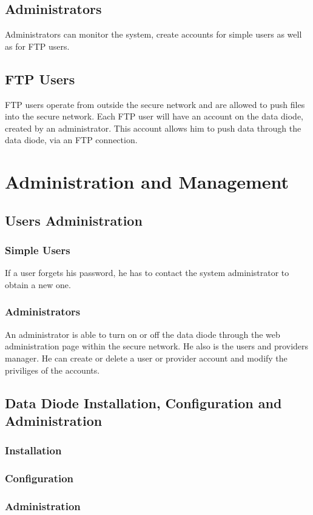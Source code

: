 \documentclass[a4paper,11pt]{article}
\begin{document}
\subsection{Administrators}
Administrators can monitor the system, create accounts for simple users as well as for FTP users.

\subsection{FTP Users}
FTP users operate from outside the secure network and are allowed to push files into the secure network. Each FTP user will have an account on the data diode, created by an administrator. This account allows him to push data through the data diode, via an FTP connection.

\section{Administration and Management}
\subsection{Users Administration}
\subsubsection{Simple Users}
If a user forgets his password, he has to contact the system administrator to obtain a new one.
\subsubsection{Administrators}
An administrator is able to turn on or off the data diode through the web administration page within the secure network. He also is the users and providers manager. He can create or delete a user or provider account and modify the priviliges of the accounts. 
\subsection{Data Diode Installation, Configuration and Administration}
\subsubsection{Installation}
\subsubsection{Configuration}
\subsubsection{Administration}
\end{document}
